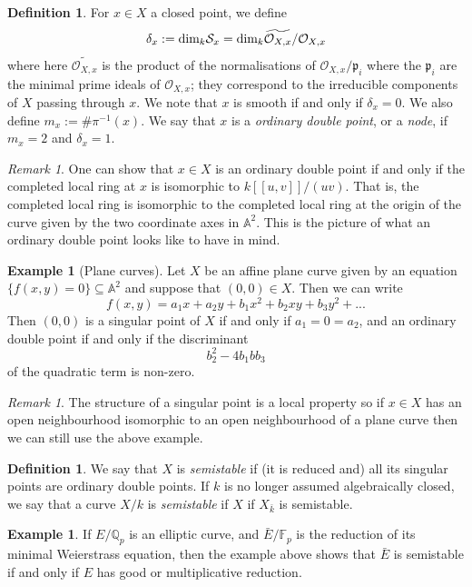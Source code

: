 \documentclass[12pt]{amsart}
\numberwithin{equation}{section}
\theoremstyle{remark}
\newtheorem{remark}[equation]{Remark}
\theoremstyle{definition}
\newtheorem{example}[equation]{Example}
\theoremstyle{definition}
\theoremstyle{definition}
\newtheorem{defi}[equation]{Definition}
\theoremstyle{definition}
\theoremstyle{definition}
\theoremstyle{definition}
\begin{document}
\begin{defi}
For $x\in X$ a closed point, we define
\[\delta_x:=\textup{dim}_k \mathcal{S}_x=\textup{dim}_k \widetilde{\mathcal{O}_{X,x}}/\mathcal{O}_{X,x}\]
where here $\widetilde{\mathcal{O}_{X,x}}$ is the product of the normalisations of $\mathcal{O}_{X,x}/\mathfrak{p}_i$ where the $\mathfrak{p}_i$ are the minimal prime ideals of $\mathcal{O}_{X,x}$; they correspond to the irreducible components of $X$ passing through $x$.
We note that $x$ is smooth if and only if $\delta_x=0$. We also define $m_x:=\#\pi^{-1}(x)$. We say that $x$ is a \textit{ordinary double point}, or a \textit{node}, if $m_x=2$ and $\delta_x=1$.
\end{defi}

\begin{remark}
One can show that $x\in X$ is an ordinary double point if and only if the completed local ring at $x$ is isomorphic to $k[[u,v]]/(uv)$. That is, the completed local ring is isomorphic to the completed local ring at the origin of the curve given by the two coordinate axes in $\mathbb{A}^2$. This is the picture of what an ordinary double point looks like to have in mind. 
\end{remark}

\begin{example}[Plane curves] \label{plane curve example}
Let $X$ be an affine plane curve given by an equation $\{f(x,y)=0\}\subseteq \mathbb{A}^2$ and suppose that $(0,0)\in X$. Then we can write 
\[f(x,y)=a_1x+a_2y+b_1x^2+b_2xy+b_3y^2+...\]
Then $(0,0)$ is a singular point of $X$ if and only if $a_1=0=a_2$, and an ordinary double point if and only if the discriminant
\[b_2^2-4b_1bb_3\]
of the quadratic term is non-zero. 
\end{example}


\begin{remark}
The structure of a singular point is a local property  so if $x\in X$ has an open neighbourhood isomorphic to an open neighbourhood of a plane curve then we can still use the above example.
\end{remark}

\begin{defi}
We say that $X$ is \textit{semistable} if (it is reduced and) all its singular points are ordinary double points. If $k$ is no longer assumed algebraically closed, we say that a curve $X/k$ is \textit{semistable} if $X$ if $X_{\bar{k}}$ is semistable.
\end{defi}

\begin{example}
If $E/\mathbb{Q}_p$ is an elliptic curve, and $\bar{E}/\mathbb{F}_p$ is the reduction of its minimal Weierstrass equation, then the example above shows that $\bar{E}$ is semistable if and only if $E$ has good or multiplicative reduction.
\end{example}
\end{document}
